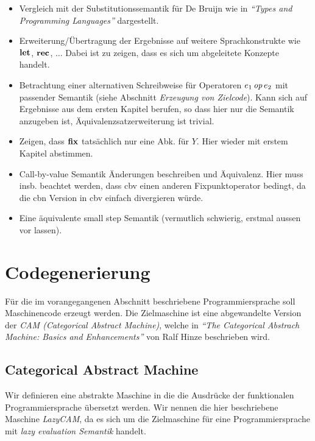 \documentclass[12pt,fleqn,a4paper]{article}
\begin{document}
\begin{itemize}
\item Vergleich mit der Substitutionssemantik f\"ur De Bruijn wie in {\em ``Types and Programming Languages''}
  dargestellt.
\item Erweiterung/\"Ubertragung der Ergebnisse auf weitere Sprachkonstrukte wie $\mathbf{let}$, $\mathbf{rec}$, $\ldots$
  Dabei ist zu zeigen, dass es sich um abgeleitete Konzepte handelt.
\item Betrachtung einer alternativen Schreibweise f\"ur Operatoren $e_1\,{\text{\it op\/}}\,e_2$ mit passender Semantik
  (siehe Abschnitt {\em Erzeugung von Zielcode}). Kann sich auf Ergebnisse aus dem ersten Kapitel berufen, so dass hier
  nur die Semantik anzugeben ist, \"Aquivalenzsatzerweiterung ist trivial.
\item Zeigen, dass $\mathbf{fix}$ tats\"achlich nur eine Abk. f\"ur $Y$. Hier wieder mit erstem Kapitel abstimmen.
\item Call-by-value Semantik \"Anderungen beschreiben und \"Aquivalenz. Hier muss insb. beachtet werden, dass
  cbv einen anderen Fixpunktoperator bedingt, da die cbn Version in cbv einfach divergieren w\"urde.
\item Eine \"aquivalente small step Semantik (vermutlich schwierig, erstmal aussen vor lassen).
\end{itemize}


\section{Codegenerierung}

F\"ur die im vorangegangenen Abschnitt beschriebene Programmiersprache soll Maschinencode erzeugt werden. Die
Zielmaschine ist eine abgewandelte Version der {\em CAM (Categorical Abstract Machine)}, welche in {\em ``The
Categorical Abstrach Machine: Basics and Enhancements''} von Ralf Hinze beschrieben wird.


\subsection{Categorical Abstract Machine}

Wir definieren eine abstrakte Maschine in die die Ausdr\"ucke der funktionalen Programmiersprache \"ubersetzt
werden. Wir nennen die hier beschriebene Maschine {\em LazyCAM}, da es sich um die Zielmaschine f\"ur eine
Programmiersprache mit {\em lazy evaluation Semantik} handelt.
\end{document}
